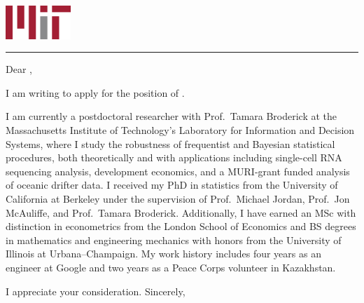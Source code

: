 




\begin{minipage}[t]{0.5\textwidth}
    \vspace{-3.5em} %
    \date \\ \\
    \address
    \vspace{1em}
\end{minipage}
\begin{minipage}[t]{0.5\textwidth}
    \hspace{2in} \includegraphics[height=0.5in]{static_images/1280px-MIT_logo.svg.png}
\end{minipage}
\noindent\textcolor{mitred}{\rule{\textwidth}{1mm}}

\vspace{3em}
Dear \whom,

\vspace{1em}
I am writing to apply for the position of \position.

\vspace{1em} I am currently a postdoctoral researcher with Prof.\ Tamara
Broderick at the Massachusetts Institute of Technology's Laboratory for
Information and Decision Systems, where I study the robustness of frequentist
and Bayesian statistical procedures, both theoretically and with applications
including single-cell RNA sequencing analysis, development economics, and a
MURI-grant funded analysis of oceanic drifter data.  I received my PhD in
statistics from the University of California at Berkeley under the supervision
of Prof.\ Michael Jordan, Prof.\ Jon McAuliffe, and Prof.\ Tamara Broderick.
Additionally, I have earned an MSc with distinction in econometrics from the
London School of Economics and BS degrees in mathematics and engineering
mechanics with honors from the University of Illinois at Urbana--Champaign.
My work history includes four years as an engineer at Google and two
years as a Peace Corps volunteer in Kazakhstan.

\vspace{1em}
\deptspecific

\vspace{2em} I appreciate your consideration.  Sincerely,

